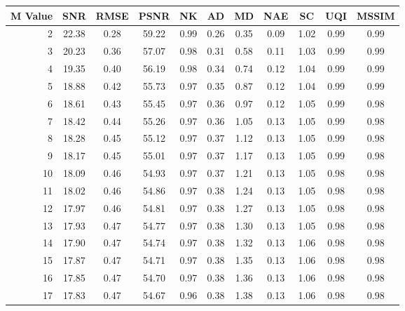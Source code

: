     \begin{table}[htb]
       \small

    \centering 
    \begin{tabular}{|r|cccccccccc|}\hline
   M Value &  SNR &  RMSE &  PSNR &  NK &  AD &  MD &  NAE &  SC &  UQI &  MSSIM \\ \hline 
      2 &  22.38 &  0.28 &  59.22 &  0.99 &  0.26 &  0.35 &  0.09 &  1.02 &  0.99 &  0.99  \\ \hline 
      3 &  20.23 &  0.36 &  57.07 &  0.98 &  0.31 &  0.58 &  0.11 &  1.03 &  0.99 &  0.99  \\ \hline 
      4 &  19.35 &  0.40 &  56.19 &  0.98 &  0.34 &  0.74 &  0.12 &  1.04 &  0.99 &  0.99  \\ \hline 
      5 &  18.88 &  0.42 &  55.73 &  0.97 &  0.35 &  0.87 &  0.12 &  1.04 &  0.99 &  0.99  \\ \hline 
      6 &  18.61 &  0.43 &  55.45 &  0.97 &  0.36 &  0.97 &  0.12 &  1.05 &  0.99 &  0.98  \\ \hline 
      7 &  18.42 &  0.44 &  55.26 &  0.97 &  0.36 &  1.05 &  0.13 &  1.05 &  0.99 &  0.98  \\ \hline 
      8 &  18.28 &  0.45 &  55.12 &  0.97 &  0.37 &  1.12 &  0.13 &  1.05 &  0.99 &  0.98  \\ \hline 
      9 &  18.17 &  0.45 &  55.01 &  0.97 &  0.37 &  1.17 &  0.13 &  1.05 &  0.99 &  0.98  \\ \hline 
      10 &  18.09 &  0.46 &  54.93 &  0.97 &  0.37 &  1.21 &  0.13 &  1.05 &  0.98 &  0.98  \\ \hline 
      11 &  18.02 &  0.46 &  54.86 &  0.97 &  0.38 &  1.24 &  0.13 &  1.05 &  0.98 &  0.98  \\ \hline 
      12 &  17.97 &  0.46 &  54.81 &  0.97 &  0.38 &  1.27 &  0.13 &  1.05 &  0.98 &  0.98  \\ \hline 
      13 &  17.93 &  0.47 &  54.77 &  0.97 &  0.38 &  1.30 &  0.13 &  1.05 &  0.98 &  0.98  \\ \hline 
      14 &  17.90 &  0.47 &  54.74 &  0.97 &  0.38 &  1.32 &  0.13 &  1.06 &  0.98 &  0.98  \\ \hline 
      15 &  17.87 &  0.47 &  54.71 &  0.97 &  0.38 &  1.35 &  0.13 &  1.06 &  0.98 &  0.98  \\ \hline 
      16 &  17.85 &  0.47 &  54.70 &  0.97 &  0.38 &  1.36 &  0.13 &  1.06 &  0.98 &  0.98  \\ \hline 
      17 &  17.83 &  0.47 &  54.67 &  0.96 &  0.38 &  1.38 &  0.13 &  1.06 &  0.98 &  0.98  \\ \hline 

\end{tabular}
\end{table}

